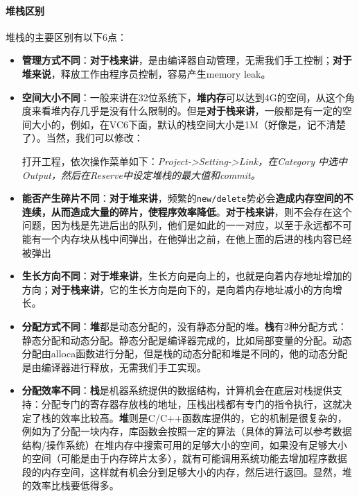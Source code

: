 \documentclass[UTF8,a4paper,12pt]{ctexbook}
\begin{document}
			\paragraph{堆栈区别}
				堆栈的主要区别有以下6点：
				\begin{itemize}[itemsep=3pt]
					\item \textbf{管理方式不同}：\textbf{对于栈来讲}，是由编译器自动管理，无需我们手工控制；\textbf{对于堆来说}，释放工作由程序员控制，容易产生memory leak。
					
					\item \textbf{空间大小不同}：一般来讲在32位系统下，\textbf{堆内存}可以达到4G的空间，从这个角度来看堆内存几乎是没有什么限制的。但是\textbf{对于栈来讲}，一般都是有一定的空间大小的，例如，在VC6下面，默认的栈空间大小是1M（好像是，记不清楚了）。当然，我们可以修改：
					
						打开工程，依次操作菜单如下：\textit{Project->Setting->Link，在Category 中选中Output，然后在Reserve中设定堆栈的最大值和commit。}
						
					\item \textbf{能否产生碎片不同}：\textbf{对于堆来讲}，频繁的\verb|new/delete|势必会\textbf{造成内存空间的不连续，从而造成大量的碎片，使程序效率降低}。\textbf{对于栈来讲}，则不会存在这个问题，因为栈是先进后出的队列，他们是如此的一一对应，以至于永远都不可能有一个内存块从栈中间弹出，在他弹出之前，在他上面的后进的栈内容已经被弹出
					
					\item \textbf{生长方向不同}：\textbf{对于堆来讲}，生长方向是向上的，也就是向着内存地址增加的方向；\textbf{对于栈来讲}，它的生长方向是向下的，是向着内存地址减小的方向增长。
					
					\item \textbf{分配方式不同}：\textbf{堆}都是动态分配的，没有静态分配的堆。\textbf{栈}有2种分配方式：静态分配和动态分配。静态分配是编译器完成的，比如局部变量的分配。动态分配由alloca函数进行分配，但是栈的动态分配和堆是不同的，他的动态分配是由编译器进行释放，无需我们手工实现。
					
					\item \textbf{分配效率不同}：\textbf{栈}是机器系统提供的数据结构，计算机会在底层对栈提供支持：分配专门的寄存器存放栈的地址，压栈出栈都有专门的指令执行，这就决定了栈的效率比较高。\textbf{堆}则是C/C++函数库提供的，它的机制是很复杂的，例如为了分配一块内存，库函数会按照一定的算法（具体的算法可以参考数据结构/操作系统）在堆内存中搜索可用的足够大小的空间，如果没有足够大小的空间（可能是由于内存碎片太多），就有可能调用系统功能去增加程序数据段的内存空间，这样就有机会分到足够大小的内存，然后进行返回。显然，堆的效率比栈要低得多。
				\end{itemize}
				
\end{document}
